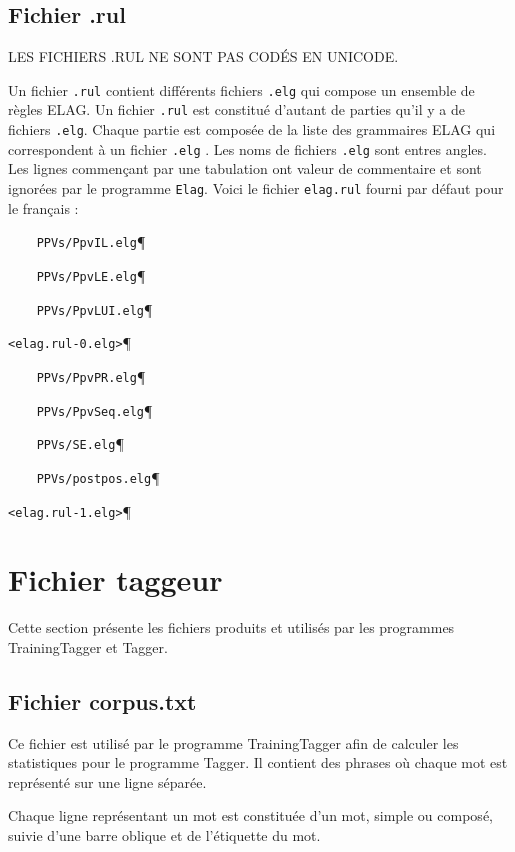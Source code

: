 \subsection{Fichier .rul}

LES FICHIERS .RUL NE SONT PAS CODÉS EN UNICODE.

\bigskip
\noindent Un fichier \verb$.rul$ contient différents fichiers \verb$.elg$ qui compose un ensemble de règles
ELAG. Un fichier \verb$.rul$ est constitué d’autant de parties qu’il y a de fichiers  \verb$.elg$. Chaque
partie est composée de la liste des grammaires ELAG qui correspondent à un fichier \verb$.elg$ . Les noms
de fichiers \verb$.elg$ sont entres angles. Les lignes commençant par une tabulation ont valeur de commentaire
et sont ignorées par le programme \verb+Elag+.
Voici le fichier \verb$elag.rul$ fourni par défaut pour le français :

\bigskip
\verb$    PPVs/PpvIL.elg$\P

\verb$    PPVs/PpvLE.elg$\P

\verb$    PPVs/PpvLUI.elg$\P

\verb$<elag.rul-0.elg>$\P

\verb$    PPVs/PpvPR.elg$\P

\verb$    PPVs/PpvSeq.elg$\P

\verb$    PPVs/SE.elg$\P

\verb$    PPVs/postpos.elg$\P

\verb$<elag.rul-1.elg>$\P

\section{Fichier taggeur}
Cette section présente les fichiers produits et utilisés par les programmes TrainingTagger et
Tagger.

\subsection{Fichier corpus.txt}
\label{section-corpus-file}
Ce fichier est utilisé par le programme TrainingTagger afin de calculer les statistiques pour le
programme Tagger. Il contient des phrases où chaque mot est représenté sur une ligne séparée.

Chaque ligne représentant un mot est constituée d'un mot, simple ou composé, suivie d'une barre
oblique et de l'étiquette du mot.

